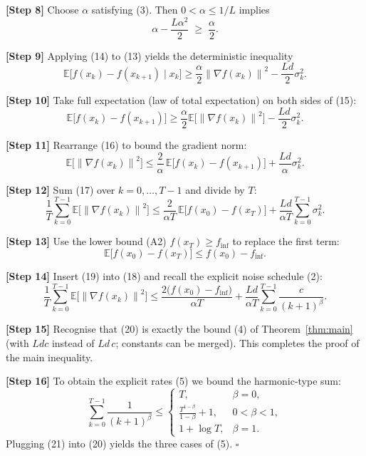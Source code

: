 \documentclass{article}
\newcommand{\E}{\mathbb{E}}
\newcommand{\norm}[1]{\left\lVert #1\right\rVert}
\begin{document}
\noindent\textbf{[Step 8]} Choose $\alpha$ satisfying (3). Then $0<\alpha\le 1/L$ implies
\[
\alpha-\frac{L\alpha^{2}}{2}\;\ge\;\frac{\alpha}{2}.
\tag{14}
\]

\noindent\textbf{[Step 9]} Applying (14) to (13) yields the deterministic inequality
\[
\E\!\big[f(x_{k})-f(x_{k+1})\mid x_{k}\big]
\ge \frac{\alpha}{2}\norm{\nabla f(x_{k})}^{2}
-\frac{L d}{2}\sigma_{k}^{2}.
\tag{15}
\]

\noindent\textbf{[Step 10]} Take full expectation (law of total expectation) on both sides of (15):
\[
\E\!\big[f(x_{k})-f(x_{k+1})\big]
\ge \frac{\alpha}{2}\E\!\big[\norm{\nabla f(x_{k})}^{2}\big]
-\frac{L d}{2}\sigma_{k}^{2}.
\tag{16}
\]

\noindent\textbf{[Step 11]} Rearrange (16) to bound the gradient norm:
\[
\E\!\big[\norm{\nabla f(x_{k})}^{2}\big]
\le \frac{2}{\alpha}\,\E\!\big[f(x_{k})-f(x_{k+1})\big]
+\frac{L d}{\alpha}\sigma_{k}^{2}.
\tag{17}
\]

\noindent\textbf{[Step 12]} Sum (17) over $k=0,\dots,T-1$ and divide by $T$:
\[
\frac{1}{T}\sum_{k=0}^{T-1}\E\!\big[\norm{\nabla f(x_{k})}^{2}\big]
\le
\frac{2}{\alpha T}\,\E\!\big[f(x_{0})-f(x_{T})\big]
+\frac{L d}{\alpha T}\sum_{k=0}^{T-1}\sigma_{k}^{2}.
\tag{18}
\]

\noindent\textbf{[Step 13]} Use the lower bound (A2) $f(x_{T})\ge f_{\inf}$ to replace the first term:
\[
\E\!\big[f(x_{0})-f(x_{T})\big]\le f(x_{0})-f_{\inf}.
\tag{19}
\]

\noindent\textbf{[Step 14]} Insert (19) into (18) and recall the explicit noise schedule (2):
\[
\frac{1}{T}\sum_{k=0}^{T-1}\E\!\big[\norm{\nabla f(x_{k})}^{2}\big]
\le
\frac{2\big(f(x_{0})-f_{\inf}\big)}{\alpha T}
+\frac{L d}{\alpha T}\sum_{k=0}^{T-1}\frac{c}{(k+1)^{\beta}}.
\tag{20}
\]

\noindent\textbf{[Step 15]} Recognise that (20) is exactly the bound (4) of Theorem~\ref{thm:main} (with $Ld c$ instead of $L d\,c$; constants can be merged). This completes the proof of the main inequality.

\noindent\textbf{[Step 16]} To obtain the explicit rates (5) we bound the harmonic‑type sum:
\[
\sum_{k=0}^{T-1}\frac{1}{(k+1)^{\beta}}
\le
\begin{cases}
T, & \beta=0,\\[4pt]
\displaystyle\frac{T^{1-\beta}}{1-\beta}+1, & 0<\beta<1,\\[8pt]
1+\log T, & \beta=1.
\end{cases}
\tag{21}
\]
Plugging (21) into (20) yields the three cases of (5). \hfill $\square$
\end{document}
